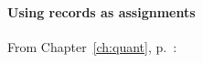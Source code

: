 
\paragraph{Using records as assignments}\mbox{}

From Chapter~\ref{ch:quant}, p.~\pageref{ex:vary-assgnmnt}:


